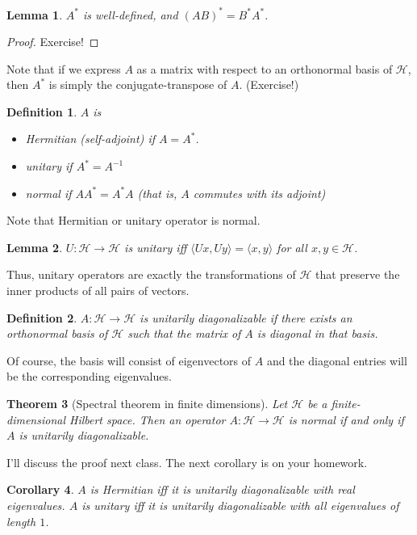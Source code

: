 \documentclass{article}
\newtheorem{thm}{Theorem}
\newtheorem*{dfn}{Definition}
\newtheorem{cor}[thm]{Corollary}
\newtheorem{lem}[thm]{Lemma}
\newcommand{\calH}{\mathcal{H}}
\begin{document}
\begin{lem}
$A^*$ is well-defined, and $(AB)^* = B^*A^*$.
\end{lem}

\begin{proof}
Exercise!
\end{proof}

Note that if we express $A$ as a matrix with respect to an orthonormal basis of $\calH$, then $A^*$ is simply the conjugate-transpose of $A$. (Exercise!)

\begin{dfn}
$A$ is 
\begin{itemize}
    \item{\em Hermitian} (self-adjoint) if $A = A^*$.
    \item{\em unitary} if $A^* = A^{-1}$
    \item{\em normal} if $AA^* = A^*A$ (that is, $A$ commutes with its adjoint)
\end{itemize}
\end{dfn}
Note that Hermitian or unitary operator is normal.

\begin{lem}
$U:\mathcal{H}\to\mathcal{H}$ is unitary iff $\langle Ux, Uy\rangle = \langle x, y\rangle$ for all $x, y\in\mathcal{H}$.
\end{lem}

Thus, unitary operators are exactly the transformations of $\calH$ that preserve the inner products of all pairs of vectors.

\begin{dfn}
$A:\mathcal{H}\to\mathcal{H}$ is {\em unitarily diagonalizable} if there exists an orthonormal basis of $\mathcal{H}$ such that the matrix of $A$ is diagonal in that basis.
\end{dfn}

Of course, the basis will consist of eigenvectors of $A$ and the diagonal entries will be the corresponding eigenvalues.

\begin{thm}[Spectral theorem in finite dimensions]
Let $\mathcal{H}$ be a finite-dimensional Hilbert space. Then an operator $A : \mathcal{H}\to\mathcal{H}$ is normal if and only if $A$ is unitarily diagonalizable.
\end{thm}

I'll discuss the proof next class.  The next corollary is on your homework.

\begin{cor}
$A$ is Hermitian iff it is unitarily diagonalizable with {\em real} eigenvalues. $A$ is unitary iff it is unitarily diagonalizable with all eigenvalues of length $1$.
\end{cor}
\end{document}

